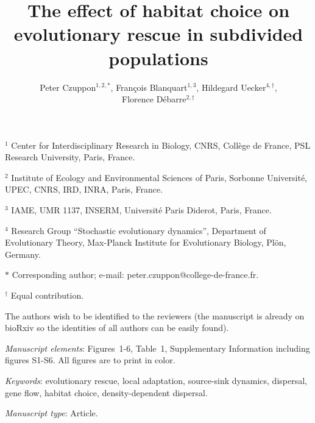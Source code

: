 \documentclass[a4paper,11pt]{article}
\title{The effect of habitat choice on evolutionary rescue in subdivided populations}
\author{Peter Czuppon$^{1,2,\ast}$, Fran\c{c}ois Blanquart$^{1,3}$, Hildegard Uecker$^{4,\dag}$,\\ Florence D\'{e}barre$^{2,\dag}$}
\date{}
\begin{document}
\maketitle

\vspace{-20pt}
\noindent $^1$ Center for Interdisciplinary Research in Biology, CNRS, Coll\`ege de France, PSL Research University, Paris, France.

\noindent $^2$ Institute of Ecology and Environmental Sciences of Paris, Sorbonne Universit\'e, UPEC, CNRS, IRD, INRA, Paris, France.

\noindent $^3$ IAME, UMR 1137, INSERM, Universit\'{e} Paris Diderot, Paris, France.

\noindent $^4$ Research Group ``Stochastic evolutionary dynamics'', Department of Evolutionary Theory, Max-Planck Institute for Evolutionary Biology, Pl\"{o}n, Germany.

\noindent $\ast$ Corresponding author; e-mail: peter.czuppon@college-de-france.fr.

\noindent $^\dag$ Equal contribution.

\noindent The authors wish to be identified to the reviewers (the manuscript is already on bioRxiv so the identities of all authors can be easily found).

\bigskip

\textit{Manuscript elements}: Figures~1-6, Table~1, Supplementary Information including figures S1-S6. All figures are to print in color.

\bigskip

\textit{Keywords}: evolutionary rescue, local adaptation, source-sink dynamics, dispersal, gene flow, habitat choice, density-dependent dispersal.

\bigskip

\textit{Manuscript type}: Article. %

\newpage

\linenumbers{}
\modulolinenumbers[2]
\end{document}
